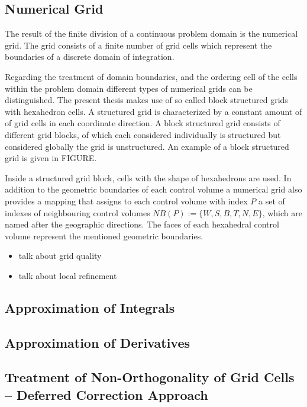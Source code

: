   \subsection{Numerical Grid}

    The result of the finite division of a continuous problem domain is the numerical grid. The grid consists of a finite number of grid cells which represent the boundaries of a discrete domain of integration. 

    Regarding the treatment of domain boundaries, and the ordering cell of the cells within the problem domain different types of numerical grids can be distinguished. The present thesis makes use of so called block structured grids with hexahedron cells. A structured grid is characterized by a constant amount of of grid cells in each coordinate direction. A block structured grid consists of different grid blocks, of which each considered individually is structured but considered globally the grid is unstructured. An example of a block structured grid is given in FIGURE.

    Inside a structured grid block, cells with the shape of hexahedrons are used. In addition to the geometric boundaries of each control volume a numerical grid also provides a mapping that assigns to each control volume with index \(P\) a set of indexes of neighbouring control volumes \(NB(P):=\{W,S,B,T,N,E\}\), which are named after the geographic directions. The faces of each hexahedral control volume represent the mentioned geometric boundaries. 

    \begin{itemize}
      \item talk about grid quality
      \item talk about local refinement
    \end{itemize}

    \subsection{Approximation of Integrals}

    \subsection{Approximation of Derivatives}

    \subsection{Treatment of Non-Orthogonality of Grid Cells -- Deferred Correction Approach}
